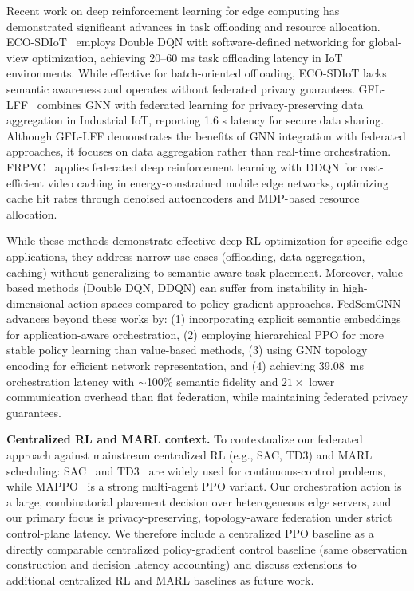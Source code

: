 \documentclass[conference]{IEEEtran}
\begin{document}
	Recent work on deep reinforcement learning for edge computing has demonstrated significant advances in task offloading and resource allocation. ECO-SDIoT~\cite{zhu2023eco} employs Double DQN with software-defined networking for global-view optimization, achieving 20--60 ms task offloading latency in IoT environments. While effective for batch-oriented offloading, ECO-SDIoT lacks semantic awareness and operates without federated privacy guarantees. GFL-LFF~\cite{regan2024gfl} combines GNN with federated learning for privacy-preserving data aggregation in Industrial IoT, reporting 1.6 s latency for secure data sharing. Although GFL-LFF demonstrates the benefits of GNN integration with federated approaches, it focuses on data aggregation rather than real-time orchestration. FRPVC~\cite{qian2025frpvc} applies federated deep reinforcement learning with DDQN for cost-efficient video caching in energy-constrained mobile edge networks, optimizing cache hit rates through denoised autoencoders and MDP-based resource allocation.
	
	\textcolor{revblue}{While these methods demonstrate effective deep RL optimization for specific edge applications, they address narrow use cases (offloading, data aggregation, caching) without generalizing to semantic-aware task placement. Moreover, value-based methods (Double DQN, DDQN) can suffer from instability in high-dimensional action spaces compared to policy gradient approaches. FedSemGNN advances beyond these works by: (1) incorporating explicit semantic embeddings for application-aware orchestration, (2) employing hierarchical PPO for more stable policy learning than value-based methods, (3) using GNN topology encoding for efficient network representation, and (4) achieving 39.08~ms orchestration latency with $\sim$100\% semantic fidelity and $21\times$ lower communication overhead than flat federation, while maintaining federated privacy guarantees.}
	
	\textcolor{revblue}{\noindent\textbf{Centralized RL and MARL context.} To contextualize our federated approach against mainstream centralized RL (e.g., SAC, TD3) and MARL scheduling: SAC~\cite{haarnoja2018sac} and TD3~\cite{fujimoto2018td3} are widely used for continuous-control problems, while MAPPO~\cite{yu2021mappo} is a strong multi-agent PPO variant. Our orchestration action is a large, combinatorial placement decision over heterogeneous edge servers, and our primary focus is privacy-preserving, topology-aware federation under strict control-plane latency. We therefore include a centralized PPO baseline as a directly comparable centralized policy-gradient control baseline (same observation construction and decision latency accounting) and discuss extensions to additional centralized RL and MARL baselines as future work.}
	
\end{document}

